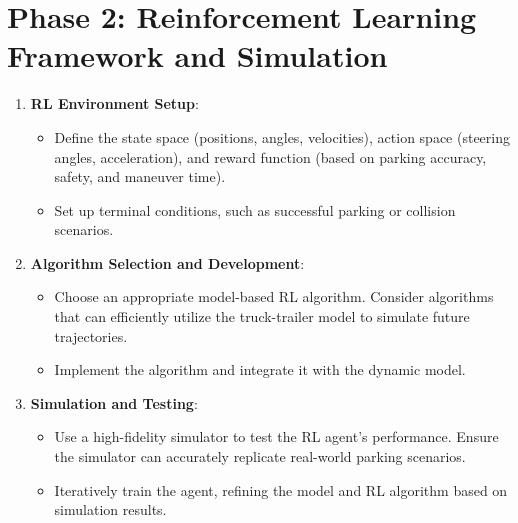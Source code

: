 \section*{Phase 2: Reinforcement Learning Framework and Simulation }
\begin{enumerate}
    \item \textbf{RL Environment Setup}:
    \begin{itemize}
        \item Define the state space (positions, angles, velocities), action space (steering angles, acceleration), and reward function (based on parking accuracy, safety, and maneuver time).
        \item Set up terminal conditions, such as successful parking or collision scenarios.
    \end{itemize}
    
    \item \textbf{Algorithm Selection and Development}:
    \begin{itemize}
        \item Choose an appropriate model-based RL algorithm. Consider algorithms that can efficiently utilize the truck-trailer model to simulate future trajectories.
        \item Implement the algorithm and integrate it with the dynamic model.
    \end{itemize}
    
    \item \textbf{Simulation and Testing}:
    \begin{itemize}
        \item Use a high-fidelity simulator to test the RL agent's performance. Ensure the simulator can accurately replicate real-world parking scenarios.
        \item Iteratively train the agent, refining the model and RL algorithm based on simulation results.
    \end{itemize}
\end{enumerate}


